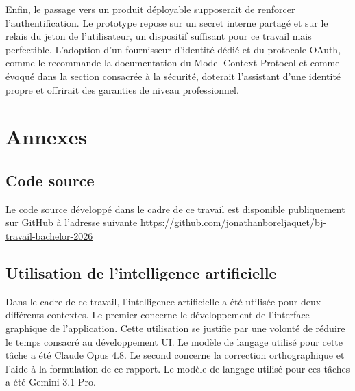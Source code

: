 \documentclass[12pt]{article}
\let\stdsection\section
\renewcommand{\section}{\clearpage\stdsection}
\begin{document}
\newline\newline
Enfin, le passage vers un produit déployable supposerait de renforcer l'authentification. Le prototype repose sur un secret interne partagé et sur le relais du jeton de l'utilisateur, un dispositif suffisant pour ce travail mais perfectible. L'adoption d'un fournisseur d'identité dédié et du protocole OAuth, comme le recommande la documentation du Model Context Protocol et comme évoqué dans la section consacrée à la sécurité, doterait l'assistant d'une identité propre et offrirait des garanties de niveau professionnel.
\printbibliography


\newpage
\section{Annexes}
\subsection{Code source}
Le code source développé dans le cadre de ce travail est disponible publiquement sur GitHub à l'adresse suivante 
\newline\newline
\url{https://github.com/jonathanboreljaquet/bj-travail-bachelor-2026}
\subsection{Utilisation de l'intelligence artificielle}
Dans le cadre de ce travail, l'intelligence artificielle a été utilisée pour deux différents contextes. 
\newline\newline
Le premier concerne le développement de l'interface graphique de l'application. Cette utilisation se justifie par une volonté de réduire le temps consacré au développement UI. Le modèle de langage utilisé pour cette tâche a été Claude Opus 4.8.
\newline\newline
Le second concerne la correction orthographique et l'aide à la formulation de ce rapport. Le modèle de langage utilisé pour ces tâches a été Gemini 3.1 Pro.
\newline\newline
\end{document}
